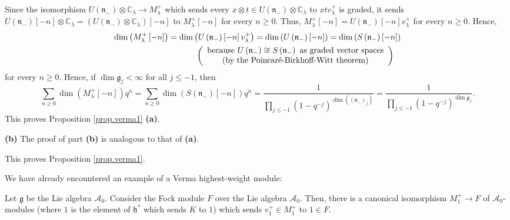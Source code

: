 \documentclass[etingof-lie.tex]{subfiles}
\begin{document}
Since the isomorphism $U\left(  \mathfrak{n}_{-}\right)  \otimes
\mathbb{C}_{\lambda}\rightarrow M_{\lambda}^{+}$ which sends every $x\otimes
t\in U\left(  \mathfrak{n}_{-}\right)  \otimes\mathbb{C}_{\lambda}$ to
$xtv_{\lambda}^{+}$ is graded, it sends $U\left(  \mathfrak{n}_{-}\right)
\left[  -n\right]  \otimes\mathbb{C}_{\lambda}=\left(  U\left(  \mathfrak{n}%
_{-}\right)  \otimes\mathbb{C}_{\lambda}\right)  \left[  -n\right]  $ to
$M_{\lambda}^{+}\left[  -n\right]  $ for every $n\geq0$. Thus, $M_{\lambda
}^{+}\left[  -n\right]  =U\left(  \mathfrak{n}_{-}\right)  \left[  -n\right]
v_{\lambda}^{+}$ for every $n\geq0$. Hence,
\begin{align*}
\dim\left(  M_{\lambda}^{+}\left[  -n\right]  \right)   &  =\dim\left(
U\left(  \mathfrak{n}_{-}\right)  \left[  -n\right]  v_{\lambda}^{+}\right)
=\dim\left(  U\left(  \mathfrak{n}_{-}\right)  \left[  -n\right]  \right)
=\dim\left(  S\left(  \mathfrak{n}_{-}\right)  \left[  -n\right]  \right) \\
&  \ \ \ \ \ \ \ \ \ \ \left(
\begin{array}
[c]{c}%
\text{because }U\left(  \mathfrak{n}_{-}\right)  \cong S\left(  \mathfrak{n}%
_{-}\right)  \text{ as graded vector spaces}\\
\text{(by the Poincar\'{e}-Birkhoff-Witt theorem)}%
\end{array}
\right)
\end{align*}
for every $n\geq0$. Hence, if $\dim\mathfrak{g}_{j}<\infty$ for all $j\leq-1$,
then%
\[
\sum\limits_{n\geq0}\dim\left(  M_{\lambda}^{+}\left[  -n\right]  \right)
q^{n}=\sum\limits_{n\geq0}\dim\left(  S\left(  \mathfrak{n}_{-}\right)
\left[  -n\right]  \right)  q^{n}=\dfrac{1}{\prod\limits_{j\leq-1}\left(
1-q^{-j}\right)  ^{\dim\left(  \left(  \mathfrak{n}_{-}\right)  _{j}\right)
}}=\dfrac{1}{\prod\limits_{j\leq-1}\left(  1-q^{-j}\right)  ^{\dim
\mathfrak{g}_{j}}}.
\]
This proves Proposition \ref{prop.verma1} \textbf{(a)}.

\textbf{(b)} The proof of part \textbf{(b)} is analogous to that of
\textbf{(a)}.

This proves Proposition \ref{prop.verma1}.

We have already encountered an example of a Verma highest-weight module:

\begin{proposition}
\label{prop.fockverma}Let $\mathfrak{g}$ be the Lie algebra $\mathcal{A}_{0}$.
Consider the Fock module $F$ over the Lie algebra $\mathcal{A}_{0}$. Then,
there is a canonical isomorphism $M_{1}^{+}\rightarrow F$ of $\mathcal{A}_{0}%
$-modules (where $1$ is the element of $\mathfrak{h}^{\ast}$ which sends $K$
to $1$) which sends $v_{1}^{+}\in M_{1}^{+}$ to $1\in F$.
\end{proposition}
\end{document}
